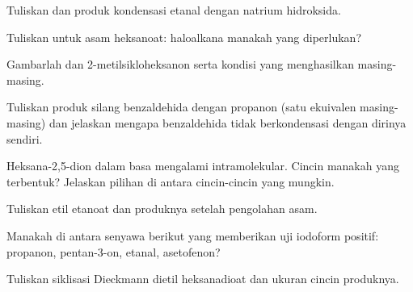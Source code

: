 \begin{exercise}[$\star$]\label{exo:b2:enolates-aldol:3}
Tuliskan  dan produk kondensasi etanal dengan natrium hidroksida.
\end{exercise}

\begin{exercise}[$\star$]\label{exo:b2:enolates-aldol:4}
Tuliskan  untuk asam heksanoat: haloalkana manakah yang diperlukan?
\end{exercise}

\begin{exercise}[$\star\star$]\label{exo:b2:enolates-aldol:5}
Gambarlah  dan  2-metilsikloheksanon serta
kondisi yang menghasilkan masing-masing.
\end{exercise}

\begin{exercise}[$\star\star$]\label{exo:b2:enolates-aldol:6}
Tuliskan produk  silang benzaldehida dengan propanon (satu
ekuivalen masing-masing) dan jelaskan mengapa benzaldehida tidak
berkondensasi dengan dirinya sendiri.
\end{exercise}

\begin{exercise}[$\star\star$]\label{exo:b2:enolates-aldol:7}
Heksana-2,5-dion dalam basa mengalami  intramolekular.
Cincin manakah yang terbentuk? Jelaskan pilihan di antara cincin-cincin yang
mungkin.
\end{exercise}

\begin{exercise}[$\star\star$]\label{exo:b2:enolates-aldol:8}
Tuliskan  etil etanoat dan produknya setelah pengolahan asam.
\end{exercise}

\begin{exercise}[$\star\star$]\label{exo:b2:enolates-aldol:9}
Manakah di antara senyawa berikut yang memberikan uji iodoform positif: propanon, pentan-3-on, etanal, asetofenon?
\end{exercise}

\begin{exercise}[$\star\star\star$]\label{exo:b2:enolates-aldol:10}
Tuliskan siklisasi Dieckmann dietil heksanadioat dan ukuran cincin produknya.
\end{exercise}

